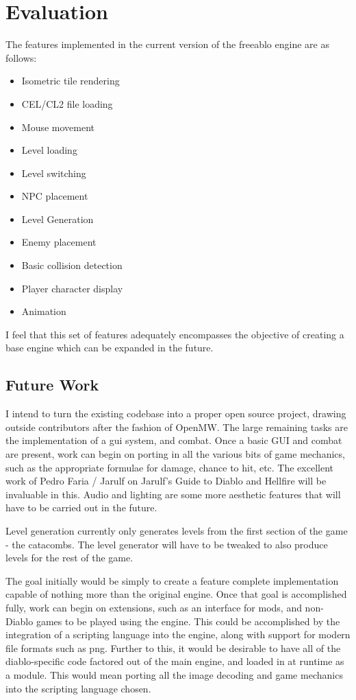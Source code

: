 \chapter{Evaluation}
	The features implemented in the current version of the freeablo engine are as follows:\\
	\begin{itemize}
		\item{Isometric tile rendering}
		\item{CEL/CL2 file loading}
		\item{Mouse movement}
		\item{Level loading}
		\item{Level switching}
		\item{NPC placement}
		\item{Level Generation}
		\item{Enemy placement}
		\item{Basic collision detection}
		\item{Player character display}
		\item{Animation}
	\end{itemize}
	
	I feel that this set of features adequately encompasses the objective of creating a base engine which can be expanded in the future.
	
	\section{Future Work}
	I intend to turn the existing codebase into a proper open source project, drawing outside contributors after the fashion of OpenMW\cite{openmw}. The large remaining tasks are the implementation of a gui system, and combat.
	Once a basic GUI and combat are present, work can begin on porting in all the various bits of game mechanics, such as the appropriate formulae for damage, chance to hit, etc. The excellent work of Pedro Faria / Jarulf on Jarulf's Guide to Diablo and Hellfire\cite{jarulf} will be invaluable in this.
	Audio and lighting are some more aesthetic features that will have to be carried out in the future.
	
	Level generation currently only generates levels from the first section of the game - the catacombs. The level generator will have to be tweaked to also produce levels for the rest of the game.
	
	The goal initially would be simply to create a feature complete implementation capable of nothing more than the original engine. Once that goal is accomplished fully, work can begin on extensions, such as an interface for mods, and non-Diablo games to be played using the engine.
	This could be accomplished by the integration of a scripting language into the engine, along with support for modern file formats such as png. 
	Further to this, it would be desirable to have all of the diablo-specific code factored out of the main engine, and loaded in at runtime as a module. This would mean porting all the image decoding and game mechanics into the scripting language chosen.
	
